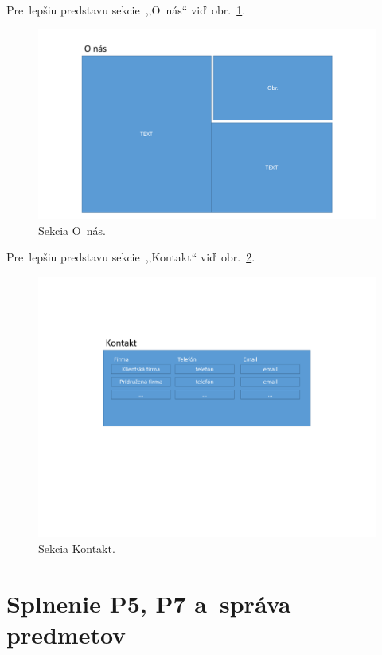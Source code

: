 Pre~lepšiu predstavu sekcie~,,O~nás`` viď~obr.~\ref{about}.

\begin{figure}[H]\centering
\includegraphics[width=140mm]{../img/UI concept/about}
\caption{Sekcia O~nás.}
\label{about}
\end{figure}

Pre~lepšiu predstavu sekcie~,,Kontakt`` viď~obr.~\ref{contact}.

\begin{figure}[H]\centering
\includegraphics[width=140mm]{../img/UI concept/contact}
\caption{Sekcia Kontakt.}
\label{contact}
\end{figure}

\section{Splnenie P5, P7 a~správa predmetov}
\label{splnenie p5 p7 a sprava predmetov}

